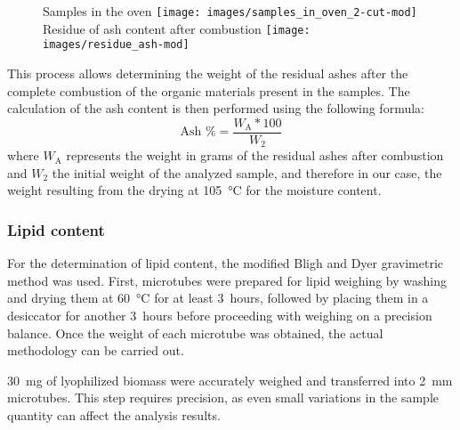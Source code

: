 \begin{figure}[H]
\centering
	\subcaptionbox%
	{Samples in the oven\label{subfig:samples_in_oven_2}}%
		{\texttt{[image: images/samples\_in\_oven\_2-cut-mod]}}%
\hspace*{0.1\textwidth}%
	\subcaptionbox%
		{Residue of ash content after combustion\label{subfig:residue_ash}}%
		{\texttt{[image: images/residue\_ash-mod]}}%
\caption{}
\end{figure}

This process allows determining the weight of the residual ashes after the complete combustion of the organic materials present in the samples. The calculation of the ash content is then performed using the following formula:
\[
\text{Ash \%} = \frac{W_\text{A} * 100}{W_2}
\]
where $ W_\text{A} $ represents the weight in grams of the residual ashes after combustion and $ W_2 $ the initial weight of the analyzed sample, and therefore in our case, the weight resulting from the drying at \qty{105}{\degreeCelsius} for the moisture content.


\subsubsection{Lipid content}
For the determination of lipid content, the modified Bligh and Dyer gravimetric method \parencite{bligh_RAPID_1959} was used. First, microtubes were prepared for lipid weighing by washing and drying them at \qty{60}{\degreeCelsius} for at least \qty{3}{hours}, followed by placing them in a desiccator for another \qty{3}{hours} before proceeding with weighing on a precision balance. Once the weight of each microtube was obtained, the actual methodology can be carried out.

\zxriv{}\qty{30}{\milli\gram} of lyophilized biomass were accurately weighed and transferred into \qty{2}{\milli\metre} microtubes. This step requires precision, as even small variations in the sample quantity can affect the analysis results.

